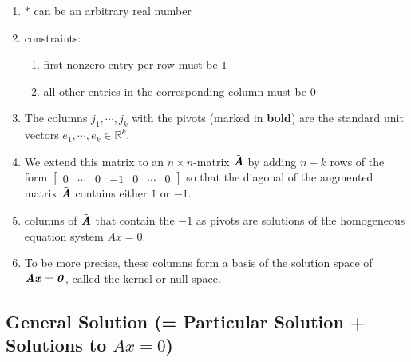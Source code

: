 \begin{enumerate}
    \item $*$ can be an arbitrary real number
    \hfill \cite{mfml/book/mml/Deisenroth-Faisal-Ong}

    \item constraints:
    \begin{enumerate}
        \item first nonzero entry per row must be $1$
        \hfill \cite{mfml/book/mml/Deisenroth-Faisal-Ong}

        \item all other entries in the corresponding column must be $0$
        \hfill \cite{mfml/book/mml/Deisenroth-Faisal-Ong}
    \end{enumerate}

    \item The columns $j_1, \cdots , j_k$ with the pivots (marked in \textbf{bold}) are the standard unit vectors $e_1, \cdots , e_k \in \mathbb{R}^k$.
    \hfill \cite{mfml/book/mml/Deisenroth-Faisal-Ong}

    \item We extend this matrix to an $n \times n$-matrix $\tilde{\text{\textbf{\textit{A}}}}$ by adding $n - k$ rows of the form 
    $
        \begin{bmatrix}
            0 & \cdots & 0 & -1 & 0 & \cdots & 0
        \end{bmatrix}
    $
    so that the diagonal of the augmented matrix $\tilde{\text{\textbf{\textit{A}}}}$ contains either $1$ or $-1$.
    \hfill \cite{mfml/book/mml/Deisenroth-Faisal-Ong}

    \item columns of $\tilde{\text{\textbf{\textit{A}}}}$ that contain the $-1$ as pivots are solutions of the homogeneous equation system $Ax = 0$.
    \hfill \cite{mfml/book/mml/Deisenroth-Faisal-Ong}

    \item To be more precise, these columns form a basis of the solution space of $\text{\textbf{\textit{Ax}}} = \text{\textbf{\textit{0}}}$, called the kernel or null space.
    \hfill \cite{mfml/book/mml/Deisenroth-Faisal-Ong}
\end{enumerate}





\subsection{General Solution (= Particular Solution + Solutions to $Ax=0$)}

